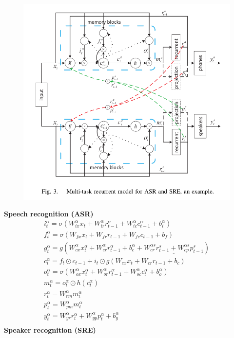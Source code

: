 \documentclass{article}
\begin{document}
	\begin{figure}[H]
		\centering
		\includegraphics[width=0.75\linewidth]{images/multi-task-recurrent-model.png}
		\label{fig:writing-thesis}
	\end{figure}
	\textbf{Speech recognition (ASR)}
	\begin{gather*}
		i^{\alpha}_t = \sigma(W^{\alpha}_{ix}x_t + W^{\alpha}_{ir}r^{\alpha}_{t-1} + W^{\alpha}_{ic}c^{\alpha}_{t-1}+b^{\alpha}_i)\\
		f^{\alpha}_t = \sigma(W_{fx}x_t + W_{fr}r_{t-1} + W_{fc}c_{t-1}+b_f)\\
		g^{\alpha}_t = g(W^{\alpha}_{cx}x^{\alpha}_t + W^{\alpha}_{cr}r^{\alpha}_{t-1} + b^{\alpha}_{c} + \underline{W^{\alpha s}_{cr}r^{s}_{t-1} + W^{\alpha s}_{cp}p^{s}_{t-1}})\\
		c^{\alpha}_t = f_t \odot c_{t-1} + i_t \odot g(W_{cx}x_t + W_{cr}r_{t-1} + b_c)\\
		o^{\alpha}_t = \sigma(W^{\alpha}_{ox}x^{\alpha}_t + W^{\alpha}_{or}r^{\alpha}_{t-1} + W^{\alpha}_{oc}c^{\alpha}_t + b^{\alpha}_o)\\
		m^{\alpha}_t = o^{\alpha}_t \odot h(c^{\alpha}_t)\\
		r^{\alpha}_t = W^{\alpha}_{rm}m^{\alpha}_t\\
		p^{\alpha}_t = W^{\alpha}_{pm}m^{\alpha}_t\\
		y^{\alpha}_t = W^{\alpha}_{yr}r^{\alpha}_t + W^{\alpha}_{yp}p^{\alpha}_t + b^{\alpha}_y\\
	\end{gather*}
	\textbf{Speaker recognition (SRE)}
\end{document}
